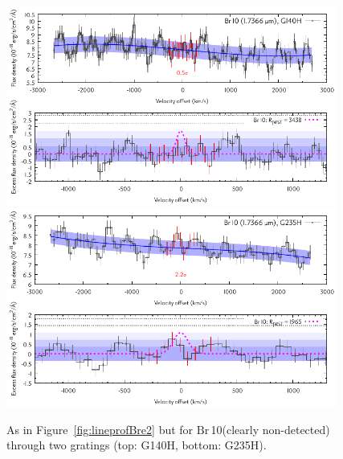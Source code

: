 \documentclass[twocolumn,twocolumnappendix]{aastex631}
\def\Brz{\ensuremath{\mathrm{Br}}\,10\xspace}               %
\begin{document}
\begin{figure}
 \centering
 \includegraphics[width=0.97\textwidth]{TWA27b_g140h-f100lp_rood_sigkorr_Brz_Dv2700_ohni300_Abb_simul.pdf}
 \includegraphics[width=0.97\textwidth]{TWA27b_g235h-f170lp_blauw_sigkorr_Brz_Dv2700_ohni300_Abb_simul.pdf}
\caption{%
As in Figure~\ref{fig:lineprofBre2} but for \Brz (clearly non-detected) through two gratings (top: G140H, bottom: G235H).
}
\label{fig:lineprofBrz2}
\end{figure}
\end{document}

